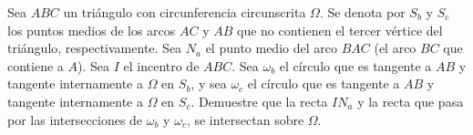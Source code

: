 Sea $ABC$ un triángulo con circunferencia circunscrita $\Omega$. Se denota por $S_b$ y $S_c$ los puntos medios de los arcos $AC$ y $AB$ que no contienen el tercer vértice del triángulo, respectivamente. Sea $N_a$ el punto medio del arco $BAC$ (el arco $BC$ que contiene a $A$). Sea $I$ el incentro de $ABC$. Sea $\omega_b$ el círculo que es tangente a $AB$ y tangente internamente a $\Omega$ en $S_b$, y sea $\omega_c$ el círculo que es tangente a $AB$ y tangente internamente a $\Omega$ en $S_c$. Demuestre que la recta $IN_a$ y la recta que pasa por las intersecciones de $\omega_b$ y $\omega_c$, se intersectan sobre $\Omega$.